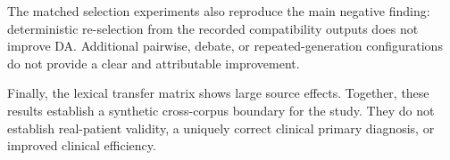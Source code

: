 The matched selection experiments also reproduce the main negative finding: deterministic re-selection from the recorded compatibility outputs does not improve DA. Additional pairwise, debate, or repeated-generation configurations do not provide a clear and attributable improvement.

Finally, the lexical transfer matrix shows large source effects. Together, these results establish a synthetic cross-corpus boundary for the study. They do not establish real-patient validity, a uniquely correct clinical primary diagnosis, or improved clinical efficiency.
